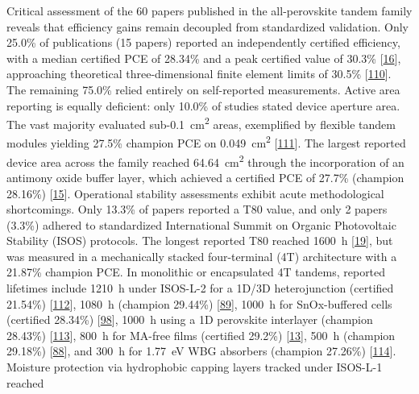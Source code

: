 \documentclass[
  11pt,
]{article}
\begin{document}
Critical assessment of the 60 papers published in the all-perovskite
tandem family reveals that efficiency gains remain decoupled from
standardized validation. Only 25.0\% of publications (15 papers)
reported an independently certified efficiency, with a median certified
PCE of 28.34\% and a peak certified value of 30.3\%
{[}\href{https://doi.org/10.1038/s41565-026-02165-6}{16}{]}, approaching
theoretical three-dimensional finite element limits of 30.5\%
{[}\href{https://doi.org/10.1002/solr.70302}{110}{]}. The remaining
75.0\% relied entirely on self-reported measurements. Active area
reporting is equally deficient: only 10.0\% of studies stated device
aperture area. The vast majority evaluated
sub-\qty{0.1}{\centi\meter\squared} areas, exemplified by flexible
tandem modules yielding 27.5\% champion PCE on
\qty{0.049}{\centi\meter\squared}
{[}\href{https://doi.org/10.1002/flm2.70045}{111}{]}. The largest
reported device area across the family reached
\qty{64.64}{\centi\meter\squared} through the incorporation of an
antimony oxide buffer layer, which achieved a certified PCE of 27.7\%
(champion 28.16\%)
{[}\href{https://doi.org/10.1038/s41467-026-70848-8}{15}{]}. Operational
stability assessments exhibit acute methodological shortcomings. Only
13.3\% of papers reported a T80 value, and only 2 papers (3.3\%) adhered
to standardized International Summit on Organic Photovoltaic Stability
(ISOS) protocols. The longest reported T80 reached \qty{1600}{\hour}
{[}\href{https://doi.org/10.1002/pip.70077}{19}{]}, but was measured in
a mechanically stacked four-terminal (4T) architecture with a 21.87\%
champion PCE. In monolithic or encapsulated 4T tandems, reported
lifetimes include \qty{1210}{\hour} under ISOS-L-2 for a 1D/3D
heterojunction (certified 21.54\%)
{[}\href{https://doi.org/10.1038/s41467-026-72099-z}{112}{]},
\qty{1080}{\hour} (champion 29.44\%)
{[}\href{https://doi.org/10.1002/adma.73682}{89}{]}, \qty{1000}{\hour}
for SnOx-buffered cells (certified 28.34\%)
{[}\href{https://doi.org/10.1021/acsenergylett.6c00227}{98}{]},
\qty{1000}{\hour} using a 1D perovskite interlayer (champion 28.43\%)
{[}\href{https://doi.org/10.1021/acsenergylett.5c04243}{113}{]},
\qty{800}{\hour} for MA-free films (certified 29.2\%)
{[}\href{https://doi.org/10.1038/s41467-025-68213-2}{13}{]},
\qty{500}{\hour} (champion 29.18\%)
{[}\href{https://doi.org/10.1002/anie.5595275}{88}{]}, and
\qty{300}{\hour} for \qty{1.77}{\electronvolt} WBG absorbers (champion
27.26\%) {[}\href{https://doi.org/10.1002/solr.70387}{114}{]}. Moisture
protection via hydrophobic capping layers tracked under ISOS-L-1 reached
\end{document}
